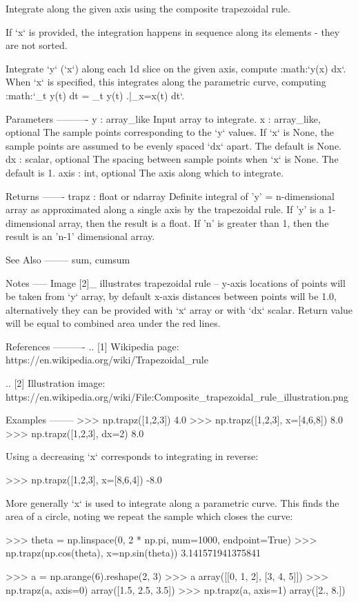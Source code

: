 \begin{DoxyVerb}Integrate along the given axis using the composite trapezoidal rule.

If `x` is provided, the integration happens in sequence along its
elements - they are not sorted.

Integrate `y` (`x`) along each 1d slice on the given axis, compute
:math:`\int y(x) dx`.
When `x` is specified, this integrates along the parametric curve,
computing :math:`\int_t y(t) dt =
\int_t y(t) \left.\right|_{x=x(t)} dt`.

Parameters
----------
y : array_like
    Input array to integrate.
x : array_like, optional
    The sample points corresponding to the `y` values. If `x` is None,
    the sample points are assumed to be evenly spaced `dx` apart. The
    default is None.
dx : scalar, optional
    The spacing between sample points when `x` is None. The default is 1.
axis : int, optional
    The axis along which to integrate.

Returns
-------
trapz : float or ndarray
    Definite integral of 'y' = n-dimensional array as approximated along
    a single axis by the trapezoidal rule. If 'y' is a 1-dimensional array,
    then the result is a float. If 'n' is greater than 1, then the result
    is an 'n-1' dimensional array.
    
See Also
--------
sum, cumsum

Notes
-----
Image [2]_ illustrates trapezoidal rule -- y-axis locations of points
will be taken from `y` array, by default x-axis distances between
points will be 1.0, alternatively they can be provided with `x` array
or with `dx` scalar.  Return value will be equal to combined area under
the red lines.


References
----------
.. [1] Wikipedia page: https://en.wikipedia.org/wiki/Trapezoidal_rule

.. [2] Illustration image:
       https://en.wikipedia.org/wiki/File:Composite_trapezoidal_rule_illustration.png

Examples
--------
>>> np.trapz([1,2,3])
4.0
>>> np.trapz([1,2,3], x=[4,6,8])
8.0
>>> np.trapz([1,2,3], dx=2)
8.0

Using a decreasing `x` corresponds to integrating in reverse:

>>> np.trapz([1,2,3], x=[8,6,4])  
-8.0

More generally `x` is used to integrate along a parametric curve.
This finds the area of a circle, noting we repeat the sample which closes
the curve:

>>> theta = np.linspace(0, 2 * np.pi, num=1000, endpoint=True)
>>> np.trapz(np.cos(theta), x=np.sin(theta))
3.141571941375841

>>> a = np.arange(6).reshape(2, 3)
>>> a
array([[0, 1, 2],
       [3, 4, 5]])
>>> np.trapz(a, axis=0)
array([1.5, 2.5, 3.5])
>>> np.trapz(a, axis=1)
array([2.,  8.])
\end{DoxyVerb}
